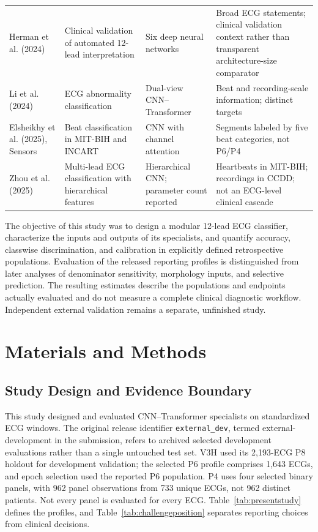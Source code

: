 \documentclass[life,article,submit,moreauthors]{Definitions/mdpi}
\begin{document}
\begin{table}[htbp]
\begin{tabular}{@{}p{}p{}p{}p{}@{}}
Herman et al. (2024) & Clinical validation of automated 12-lead interpretation & Six deep neural networks & Broad ECG statements; clinical validation context rather than transparent architecture-size comparator \\
Li et al. (2024) & ECG abnormality classification & Dual-view CNN--Transformer & Beat and recording-scale information; distinct targets \\
Elsheikhy et al. (2025), Sensors & Beat classification in MIT-BIH and INCART & CNN with channel attention & Segments labeled by five beat categories, not P6/P4 \\
Zhou et al. (2025) & Multi-lead ECG classification with hierarchical features & Hierarchical CNN; parameter count reported & Heartbeats in MIT-BIH; recordings in CCDD; not an ECG-level clinical cascade \\
\bottomrule
\end{tabular}
\end{table}

The objective of this study was to design a modular 12-lead ECG classifier, characterize the inputs and outputs of its specialists, and quantify accuracy, classwise discrimination, and calibration in explicitly defined retrospective populations. Evaluation of the released reporting profiles is distinguished from later analyses of denominator sensitivity, morphology inputs, and selective prediction. The resulting estimates describe the populations and endpoints actually evaluated and do not measure a complete clinical diagnostic workflow. Independent external validation remains a separate, unfinished study.

\section{Materials and Methods}

\subsection{Study Design and Evidence Boundary}


\label{sec:boundary}
This study designed and evaluated CNN--Transformer specialists on standardized ECG windows. \label{sec:study-design}
The original release identifier \texttt{external\_dev}, termed external-development in the submission, refers to archived selected development evaluations rather than a single untouched test set. V3H used its 2,193-ECG P8 holdout for development validation; the selected P6 profile comprises 1,643 ECGs, and epoch selection used the reported P6 population. P4 uses four selected binary panels, with 962 panel observations from 733 unique ECGs, not 962 distinct patients. Not every panel is evaluated for every ECG. Table~\ref{tab:presentstudy} defines the profiles, and Table~\ref{tab:challengeposition} separates reporting choices from clinical decisions.
\end{document}
